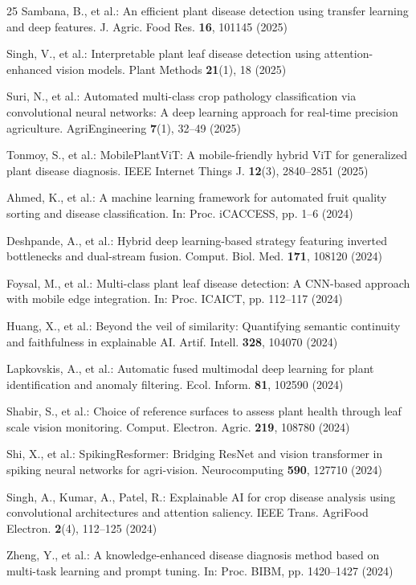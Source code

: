 \documentclass[runningheads]{llncs}
\begin{document}
\begin{thebibliography}{25}
Sambana, B., et al.: An efficient plant disease detection using transfer learning and deep features. J. Agric. Food Res. \textbf{16}, 101145 (2025)

Singh, V., et al.: Interpretable plant leaf disease detection using attention-enhanced vision models. Plant Methods \textbf{21}(1), 18 (2025)

Suri, N., et al.: Automated multi-class crop pathology classification via convolutional neural networks: A deep learning approach for real-time precision agriculture. AgriEngineering \textbf{7}(1), 32--49 (2025)

Tonmoy, S., et al.: MobilePlantViT: A mobile-friendly hybrid ViT for generalized plant disease diagnosis. IEEE Internet Things J. \textbf{12}(3), 2840--2851 (2025)

Ahmed, K., et al.: A machine learning framework for automated fruit quality sorting and disease classification. In: Proc. iCACCESS, pp. 1--6 (2024)

Deshpande, A., et al.: Hybrid deep learning-based strategy featuring inverted bottlenecks and dual-stream fusion. Comput. Biol. Med. \textbf{171}, 108120 (2024)

Foysal, M., et al.: Multi-class plant leaf disease detection: A CNN-based approach with mobile edge integration. In: Proc. ICAICT, pp. 112--117 (2024)

Huang, X., et al.: Beyond the veil of similarity: Quantifying semantic continuity and faithfulness in explainable AI. Artif. Intell. \textbf{328}, 104070 (2024)

Lapkovskis, A., et al.: Automatic fused multimodal deep learning for plant identification and anomaly filtering. Ecol. Inform. \textbf{81}, 102590 (2024)

Shabir, S., et al.: Choice of reference surfaces to assess plant health through leaf scale vision monitoring. Comput. Electron. Agric. \textbf{219}, 108780 (2024)

Shi, X., et al.: SpikingResformer: Bridging ResNet and vision transformer in spiking neural networks for agri-vision. Neurocomputing \textbf{590}, 127710 (2024)

Singh, A., Kumar, A., Patel, R.: Explainable AI for crop disease analysis using convolutional architectures and attention saliency. IEEE Trans. AgriFood Electron. \textbf{2}(4), 112--125 (2024)

Zheng, Y., et al.: A knowledge-enhanced disease diagnosis method based on multi-task learning and prompt tuning. In: Proc. BIBM, pp. 1420--1427 (2024)
\end{thebibliography}
\end{document}
